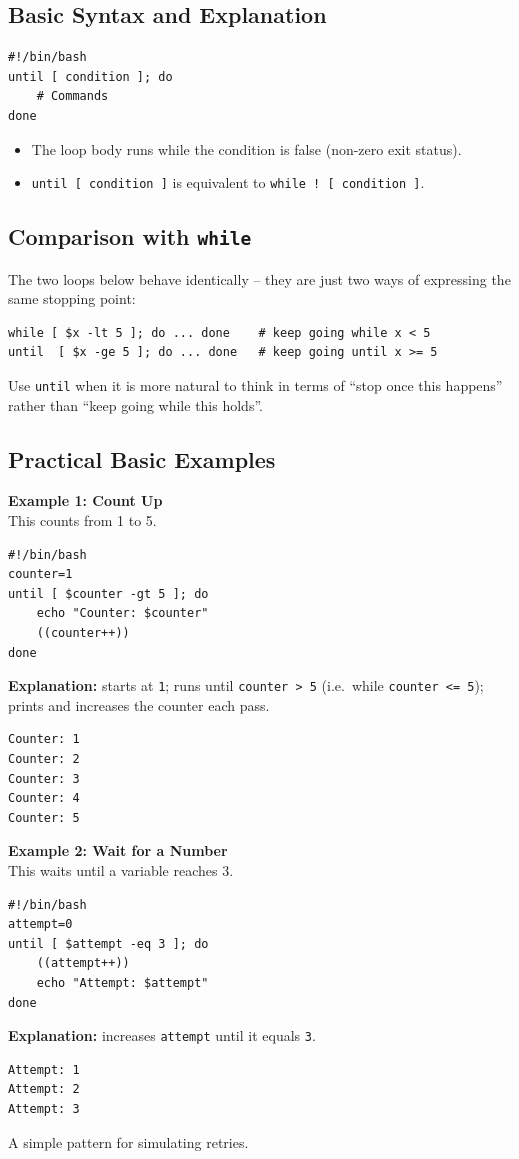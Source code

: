 \subsection{Basic Syntax and Explanation}
\begin{lstlisting}[language=Terminal]
#!/bin/bash
until [ condition ]; do
    # Commands
done
\end{lstlisting}
\begin{itemize}
    \item The loop body runs while the condition is false (non-zero exit status).
    \item \texttt{until [ condition ]} is equivalent to \texttt{while ! [ condition ]}.
\end{itemize}

\subsection{Comparison with \texttt{while}}
The two loops below behave identically -- they are just two ways of expressing the same stopping point:
\begin{lstlisting}[language=Terminal]
while [ $x -lt 5 ]; do ... done    # keep going while x < 5
until  [ $x -ge 5 ]; do ... done   # keep going until x >= 5
\end{lstlisting}
Use \texttt{until} when it is more natural to think in terms of ``stop once this happens'' rather than ``keep going while this holds''.

\subsection{Practical Basic Examples}

\textbf{Example 1: Count Up}\\
This counts from 1 to 5.
\begin{lstlisting}[language=Terminal]
#!/bin/bash
counter=1
until [ $counter -gt 5 ]; do
    echo "Counter: $counter"
    ((counter++))
done
\end{lstlisting}
\textbf{Explanation:} starts at \texttt{1}; runs until \texttt{counter > 5} (i.e.\ while \texttt{counter <= 5}); prints and increases the counter each pass.
\begin{lstlisting}[language=Terminal]
Counter: 1
Counter: 2
Counter: 3
Counter: 4
Counter: 5
\end{lstlisting}

\textbf{Example 2: Wait for a Number}\\
This waits until a variable reaches 3.
\begin{lstlisting}[language=Terminal]
#!/bin/bash
attempt=0
until [ $attempt -eq 3 ]; do
    ((attempt++))
    echo "Attempt: $attempt"
done
\end{lstlisting}
\textbf{Explanation:} increases \texttt{attempt} until it equals \texttt{3}.
\begin{lstlisting}[language=Terminal]
Attempt: 1
Attempt: 2
Attempt: 3
\end{lstlisting}
A simple pattern for simulating retries.

